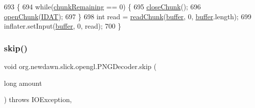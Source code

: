 \begin{DoxyCode}
693                                                                       \{
694         \textcolor{keywordflow}{while}(\mbox{\hyperlink{classorg_1_1newdawn_1_1slick_1_1opengl_1_1_p_n_g_decoder_a7304a0a75ad5821c3f8241a829705b42}{chunkRemaining}} == 0) \{
695             \mbox{\hyperlink{classorg_1_1newdawn_1_1slick_1_1opengl_1_1_p_n_g_decoder_a8be80afb9e66943952de1e7d429303ac}{closeChunk}}();
696             \mbox{\hyperlink{classorg_1_1newdawn_1_1slick_1_1opengl_1_1_p_n_g_decoder_afa7ad43df0de182a0fd27c9f6ca52e3d}{openChunk}}(\mbox{\hyperlink{classorg_1_1newdawn_1_1slick_1_1opengl_1_1_p_n_g_decoder_a99571bca75a4f458cb1113006aa99075}{IDAT}});
697         \}
698         \textcolor{keywordtype}{int} read = \mbox{\hyperlink{classorg_1_1newdawn_1_1slick_1_1opengl_1_1_p_n_g_decoder_ae2014f14734121c02f976b1fe4733c2d}{readChunk}}(\mbox{\hyperlink{classorg_1_1newdawn_1_1slick_1_1opengl_1_1_p_n_g_decoder_ae205f9222586a2bc01a8a240c5c210ad}{buffer}}, 0, \mbox{\hyperlink{classorg_1_1newdawn_1_1slick_1_1opengl_1_1_p_n_g_decoder_ae205f9222586a2bc01a8a240c5c210ad}{buffer}}.length);
699         inflater.setInput(\mbox{\hyperlink{classorg_1_1newdawn_1_1slick_1_1opengl_1_1_p_n_g_decoder_ae205f9222586a2bc01a8a240c5c210ad}{buffer}}, 0, read);
700     \}
\end{DoxyCode}
\mbox{\label{classorg_1_1newdawn_1_1slick_1_1opengl_1_1_p_n_g_decoder_a40dd58180327dca560b33952f36a70c4}} 
\subsubsection{\texorpdfstring{skip()}{skip()}}
{\footnotesize\ttfamily void org.\+newdawn.\+slick.\+opengl.\+P\+N\+G\+Decoder.\+skip (\begin{DoxyParamCaption}\item[{long}]{amount }\end{DoxyParamCaption}) throws I\+O\+Exception\hspace{0.3cm}{\ttfamily [inline]}, {\ttfamily [private]}}



